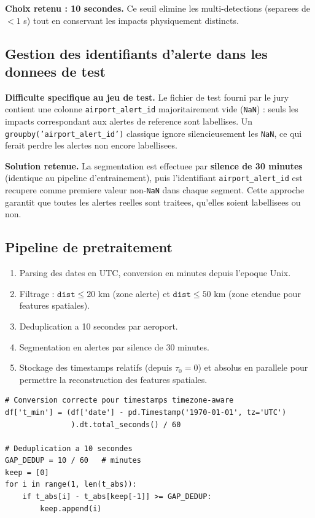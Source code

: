 \documentclass[a4paper,11pt]{article}
\begin{document}
\textbf{Choix retenu : 10 secondes.} Ce seuil elimine les multi-detections
(separees de $<1$ s) tout en conservant les impacts physiquement distincts.

\subsection{Gestion des identifiants d'alerte dans les donnees de test}

\textbf{Difficulte specifique au jeu de test.} Le fichier de test fourni par le
jury contient une colonne \texttt{airport\_alert\_id} majoritairement vide
(\texttt{NaN}) : seuls les impacts correspondant aux alertes de reference sont
labellises. Un \texttt{groupby('airport\_alert\_id')} classique ignore
silencieusement les \texttt{NaN}, ce qui ferait perdre les alertes non encore
labellisees.

\textbf{Solution retenue.} La segmentation est effectuee par \textbf{silence de
30 minutes} (identique au pipeline d'entrainement), puis l'identifiant
\texttt{airport\_alert\_id} est recupere comme premiere valeur non-\texttt{NaN}
dans chaque segment. Cette approche garantit que toutes les alertes reelles
sont traitees, qu'elles soient labellisees ou non.

\subsection{Pipeline de pretraitement}

\begin{enumerate}
  \item Parsing des dates en UTC, conversion en minutes depuis l'epoque Unix.
  \item Filtrage : $\texttt{dist} \leq 20$ km (zone alerte) et
        $\texttt{dist} \leq 50$ km (zone etendue pour features spatiales).
  \item Deduplication a 10 secondes par aeroport.
  \item Segmentation en alertes par silence de 30 minutes.
  \item Stockage des timestamps relatifs (depuis $\tau_0 = 0$) et absolus en
        parallele pour permettre la reconstruction des features spatiales.
\end{enumerate}

\begin{lstlisting}
# Conversion correcte pour timestamps timezone-aware
df['t_min'] = (df['date'] - pd.Timestamp('1970-01-01', tz='UTC')
               ).dt.total_seconds() / 60

# Deduplication a 10 secondes
GAP_DEDUP = 10 / 60   # minutes
keep = [0]
for i in range(1, len(t_abs)):
    if t_abs[i] - t_abs[keep[-1]] >= GAP_DEDUP:
        keep.append(i)
\end{lstlisting}
\end{document}

